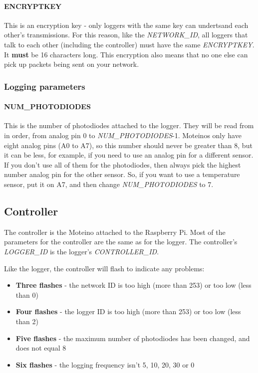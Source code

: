 \documentclass[10pt]{article}
\begin{document}
\paragraph{ENCRYPTKEY}
This is an encryption key - only loggers with the same key can undertsand each other's transmissions. For this reason, like the \textit{NETWORK\_ID}, all loggers that
talk to each other (including the controller) must have the same \textit{ENCRYPTKEY}. It \textbf{must} be 16 characters long. This encryption also means that no one
else can pick up packets being sent on your network.

\subsubsection{Logging parameters}

\paragraph{NUM\_PHOTODIODES}
This is the number of photodiodes attached to the logger. They will be read from in order, from analog pin 0 to \textit{NUM\_PHOTODIODES}-1. Moteinos only have eight analog pins (A0 to A7), so this number should never be greater than 8, but it can be less, for example, if you need to use an analog pin for a different sensor. If you don't use all of them for the photodiodes, then always pick the highest number analog pin for the other sensor. So, if you want to use a temperature sensor, put it on A7, and then change \textit{NUM\_PHOTODIODES} to 7.

\subsection{Controller}
The controller is the Moteino attached to the Raspberry Pi. Most of the parameters for the controller are the same as for the logger. The controller's \textit{LOGGER\_ID} is the logger's \textit{CONTROLLER\_ID}. 

Like the logger, the controller will flash to indicate any problems:

\begin{itemize}
 \item \textbf{Three flashes}	- the network ID is too high (more than 253) or too low (less than 0)
 \item \textbf{Four flashes}	- the logger ID is too high (more than 253) or too low (less than 2)
 \item \textbf{Five flashes}	- the maximum number of photodiodes has been changed, and does not equal 8
 \item \textbf{Six flashes}	- the logging frequency isn't 5, 10, 20, 30 or 0
\end{itemize}
\end{document}
